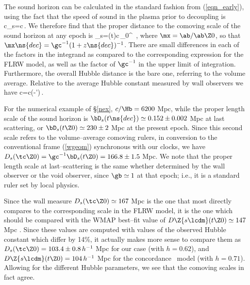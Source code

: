 \documentclass[12pt]{iopart}
\begin{document}
The sound horizon can be calculated in the standard fashion from
(\ref{eqn_early}), using the fact that the speed of sound in the
plasma prior to decoupling is
\beq
c_s={c\over{}}\,.
\eeq
We therefore find that the proper distance to the comoving scale of the
sound horizon at any epoch is
\beq
\bD_s={\ab(t)\over\ab{}}{c\over{}\,\Hb}\int_0^{\mx{}}
{\dd\mx\over{}}\,,
\eeq
where $\mx=\ab/\ab\Z0$, so that $\mx\ns{dec}=\gc^{-1}(1+z\ns{dec})^{-1}$.
There are small differences in each of the factors in the integrand as
compared to the corresponding expression for the FLRW model, as well as
the factor of ${\gc}^{-1}$ in the upper limit of integration. Furthermore,
the overall Hubble distance is the bare one, referring to the volume average.
Relative to the average Hubble constant measured by wall observers we
have
\beq
{c\over\Hb}={c(\gc-\gc')\over \Hm}\,.
\eeq

For the numerical example of \S\ref{nex}, $c/\Hb=6200$ Mpc, while
the proper length scale of the sound horizon is $\bD_s(t\ns{dec})\simeq
0.152\pm0.002$ Mpc at last scattering, or $\bD_s(t\Z0)\simeq230\pm2$ Mpc at the
present epoch. Since this second scale refers to the volume--average
comoving rulers, in conversion to the conventional frame (\ref{wgeom})
synchronous with our clocks, we have $D_s(\tc\Z0)={\gc}^{-1}\bD_s(t\Z0)
=166.8\pm1.5$ Mpc. We note that the proper length scale at last--scattering
is the same whether determined by the wall observer or the void observer,
since $\gb\simeq1$ at that epoch; i.e., it is a standard ruler set by
local physics.

Since the wall measure $D_s(\tc\Z0)\simeq167$ Mpc is the one that most
directly compares to the corresponding scale in the FLRW model, it is the
one which should be compared with the WMAP best--fit value of
$D\Z{s\lcdm}(t\Z0)\simeq147$ Mpc \cite{wmap}.
Since these values are computed with values of the observed Hubble
constant which differ by 14\%, it actually makes more sense to compare
them as $D_s(\tc\Z0)=103.4\pm0.8\,h^{-1}$ Mpc for our case (with $h=0.62$),
and $D\Z{s\lcdm}(t\Z0)=104\,h^{-1}$ Mpc for the concordance \LCDM\ model
(with $h=0.71$). Allowing for the different Hubble
parameters, we see that the comoving scales in fact agree.
\end{document}
